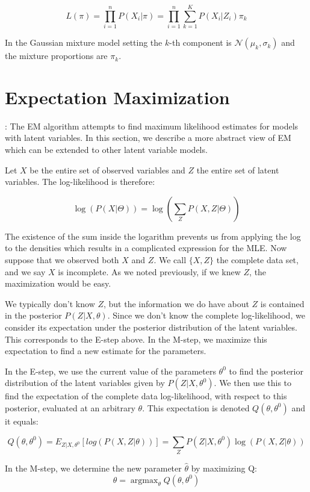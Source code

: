 \documentclass{article}
\DeclareMathOperator*{\argmax}{argmax}
\begin{document}
\[
L(\pi) = \prod_{i=1}^{n} P(X_i | \pi) = \prod_{i=1}^{n} \sum_{k=1}^{K} P(X_i | Z_i) \pi_k
\]

In the Gaussian mixture model setting the $k$-th component is $\mathcal{N}(\mu_k,\sigma_k)$ and the mixture proportions are $\pi_k$.

\section{Expectation Maximization}:
The EM algorithm attempts to find maximum likelihood estimates for models with latent variables. In this section, we describe a more abstract view of EM which can be extended to other latent variable models.

Let $X$ be the entire set of observed variables and $Z$ the entire set of latent variables. The log-likelihood is therefore:

\[ 
\log {(P(X|\Theta))} = \log \left( {\sum_Z P(X, Z |\Theta)} \right)
\]

The existence of the sum inside the logarithm prevents us from applying the log to the densities which results in a complicated expression for the MLE. Now suppose that we observed both $X$ and $Z$. We call $\{X,Z\}$ the complete data set, and we say $X$ is incomplete. As we noted previously, if we knew $Z$, the maximization would be easy.

We typically don't know $Z$, but the information we do have about $Z$ is contained in the posterior $P(Z|X,\theta)$. Since we don't know the complete log-likelihood, we consider its expectation under the posterior distribution of the latent variables. This corresponds to the E-step above. In the M-step, we maximize this expectation to find a new estimate for the parameters.

In the E-step, we use the current value of the parameters $\theta^0$ to find the posterior distribution of the latent variables given by $P(Z|X,\theta^0)$. We then use this to find the expectation of the complete data log-likelihood, with respect to this posterior, evaluated at an arbitrary $\theta$. This expectation is denoted $Q(\theta,\theta^0)$ and it equals:

\[ 
Q(\theta, \theta^0) = E_{Z | X, \theta^0} [log(P(X,Z|\theta))] = \sum_Z P(Z | X, \theta^0) \log(P(X,Z|\theta))
\]

In the M-step, we determine the new parameter $\hat{\theta}$ by maximizing Q:
\[
\hat{\theta} =  \argmax_{\theta} Q(\theta, \theta^0) 
\]

\end{document}
